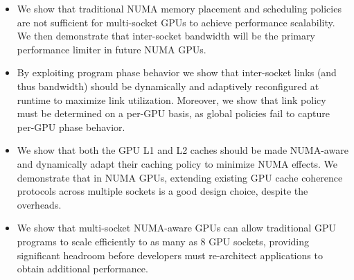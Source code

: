 \begin{itemize}
\item We show that traditional NUMA memory placement and 
scheduling policies are not sufficient for multi-socket GPUs to achieve 
performance scalability. We then demonstrate that inter-socket bandwidth will be 
the primary performance limiter in future NUMA GPUs.

\item By exploiting program phase behavior we show that inter-socket links (and 
thus bandwidth) should be dynamically and adaptively reconfigured at runtime to maximize link 
utilization. Moreover, we show that link policy must be determined on a per-GPU 
basis, as global policies fail to capture per-GPU phase behavior.

\item We show that both the GPU L1 and L2 caches should be made NUMA-aware 
and dynamically adapt their caching policy to minimize NUMA effects. We demonstrate
that in NUMA GPUs, extending existing GPU cache coherence protocols
across multiple sockets is a good design choice, despite the overheads.

\item We show that multi-socket NUMA-aware GPUs can allow traditional 
GPU programs to scale efficiently to as many as 8 GPU sockets, providing significant 
headroom before developers must re-architect applications to obtain additional performance.

\end{itemize}
